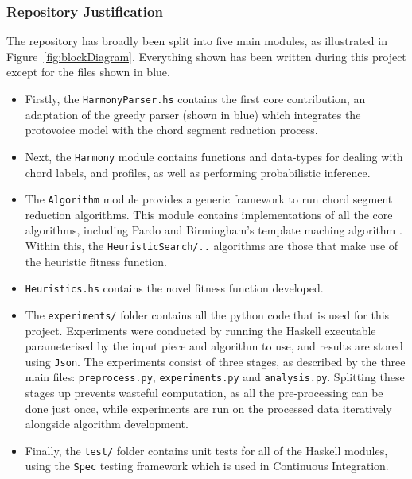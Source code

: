 \documentclass[12pt,a4paper,twoside,openany]{report} \usepackage[pdfborder={0 0 0}]{hyperref}    %
\theoremstyle{definition} \newtheorem{definition}{Definition}[section]
\begin{document}
    \FloatBarrier
    \subsubsection{Repository Justification}

    The repository has broadly been split into five main modules, as illustrated in Figure~\ref{fig:blockDiagram}.
    Everything shown has been written during this project except for the files shown in blue.
    \begin{itemize} 
      \item Firstly, the \texttt{HarmonyParser.hs} contains the first core contribution, an adaptation of the greedy
        parser (shown in blue) which integrates the protovoice model with the chord segment reduction process.
      \item Next, the \texttt{Harmony} module contains functions and data-types for dealing with chord labels, and
        profiles, as well as performing probabilistic inference. 
      \item The \texttt{Algorithm} module provides a generic framework to run chord segment reduction algorithms. This
        module contains implementations of all the core algorithms, including Pardo and Birmingham's template maching
        algorithm \cite{pardoAlgorithmsChordalAnalysis2002}. Within this, the \texttt{HeuristicSearch/..} algorithms are
        those that make use of the heuristic fitness function.
      \item \texttt{Heuristics.hs} contains the novel fitness function developed. 
      \item The \texttt{experiments/} folder contains all the python code that is used for this project. Experiments
        were conducted by running the Haskell executable parameterised by the input piece and algorithm to use, and
        results are stored using \texttt{Json}. The experiments consist of three stages, as described by the three main files: \texttt{preprocess.py}, \texttt{experiments.py} and \texttt{analysis.py}. 
        Splitting these stages up prevents wasteful computation, as all the pre-processing can be done just once, while experiments are run on the processed data iteratively alongside algorithm development. 
      \item Finally, the \texttt{test/} folder contains unit tests for all of the Haskell modules, using the
        \texttt{Spec} testing framework which is used in Continuous Integration. 
    \end{itemize}
\end{document}
